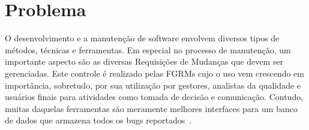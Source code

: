 %

%


\section{Problema}
\label{sec:intro-problema}

O desenvolvimento e a manutenção de software envolvem diversos tipos de métodos,
técnicas e ferramentas. Em especial no processo de manutenção, um importante
aspecto são as diversas Requisições de Mudanças que devem ser gerenciadas. Este
controle é realizado pelas FGRMs cujo o uso vem crescendo em importância,
sobretudo, por sua utilização por gestores, analistas da qualidade e usuários
finais para atividades como tomada de decisão e comunicação. Contudo, muitas
daquelas ferramentas são meramente melhores interfaces para um banco de dados
que armazena todos os bugs reportados~\cite{zimmermann2009improving}.

